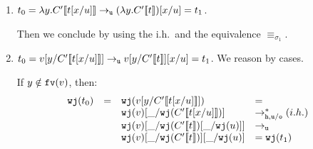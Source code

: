 \documentclass{LMCS}
\renewcommand{\>}{\rightarrow}
\def\lam{\lambda}
\def\sig{\sigma}
\newcommand{\Rew}[1]{\rightarrow_{#1}}
\newcommand{\Rewnmod}[2]{\rightarrow^*_{#1/#2}}
\newcommand{\isubs}[1]{ \{ #1  \} }
\newcommand{\dis}{{\tt j}}
\newcommand{\fv}[1]{{\tt fv}(#1)}
\newcommand{\proj}{\wfc}
\newcommand{\Gc}{{\tt w}}
\newcommand{\ih}{i.h.}
\newcommand{\wfc}{\Gc\dis}
\newcommand{\unboxed}{{\tt u}}
\newcommand{\ignore}[1]{}
\newcommand{\osym}{{\tt o}}
\newcommand{\New}{{\tt h}}
\newcommand{\ctx}[2]{#1 [ \! [#2] \! ]}
\newcommand{\void}{\_}
\begin{document}
\begin{enumerate}[$\bullet$]
\begin{enumerate}[$-$]
{        If $x \notin \fv{\ctx{C'}{t}}$, then: 
         \[ \begin{array}{lll} 
          \proj(v)\ \proj(\ctx{C'}{t}[x/u]) = \\
         \proj(v) (\proj(\ctx{C'}{t}) [x/\proj(u)])\Rew{\unboxed}\\
         (\proj(v) \proj(\ctx{C'}{t})) [x/\proj(u)]  = \proj(t_1)
          \end{array} \] 
      
        If $x \in \fv{\ctx{C'}{t}}$, then: 
      \[ \begin{array}{ll} 
         \proj(v) \proj(\ctx{C'}{t}[x/u]) = \\
         \proj(v) (\proj(\ctx{C'}{t}) \isubs{x/\proj(u)})= \\
         (\proj(v) \proj(\ctx{C'}{t})) \isubs{x/\proj(u)}  = \proj(t_1)
         \end{array} \] 
        }
        Then we conclude by using the \ih\ and the
        reduction  $\Rew{\unboxed}$. 
        
  \item $t_0 = \lam y. \ctx{C'}{t[x/u]}\Rew{\unboxed} (\lam 
        y. \ctx{C'}{t})[x/u]= t_1$.  
        \ignore{We have $\proj(t_0) =\l
        y. \proj(\ctx{C'}{t[x/u]}) \Rewnmod{\New,\unboxed}{\osym} (\ih)\ 
        \l
        y. \proj(\ctx{C'}{t}[x/u])$.

        If $x \notin \fv{\ctx{C'}{t}}$, then: 
        $\l
        y. \proj(\ctx{C'}{t}[x/u]) = \lam y. (\proj(\ctx{C'}{t}) [x/\proj(u)]) 
        \equiv_{\sig_1} \proj(t_1)$.
      
        If $x \in \fv{\ctx{C'}{t}}$, then $\l
        y. \proj(\ctx{C'}{t}[x/u]) = \lam y. (\proj(\ctx{C'}{t}) \isubs{x/\proj(u)}) 
	= \proj(t_1)$.
        }
        Then we conclude by using the \ih\ and the
        equivalence $\equiv_{\sig_1}$. 
        
\item  $t_0 = v[y/\ctx{C'}{t[x/u]}]\Rew{\unboxed}
        v[y/\ctx{C'}{t}][x/u] = t_1$. 
        We reason by cases. 


        If $y \notin \fv{v}$, then:
        \[ \begin{array}{llll} 
        \proj(t_0)&=&\proj(v[y/\ctx{C'}{t[x/u]}]) &=\\
	&&\proj(v) [\void/\proj(\ctx{C'}{t[x/u]})]	&\Rewnmod{\New, \unboxed}{\osym} (\ih)\\
        &&\proj(v) [\void/\proj(\ctx{C'}{t})[\void/\proj(u)]] &\Rew{\unboxed}\\
        &&\proj(v) [\void/\proj(\ctx{C'}{t})][\void/\proj(u)] &= \proj(t_1)
        \end{array} \] 


\end{enumerate}
\end{enumerate}
\end{document}
